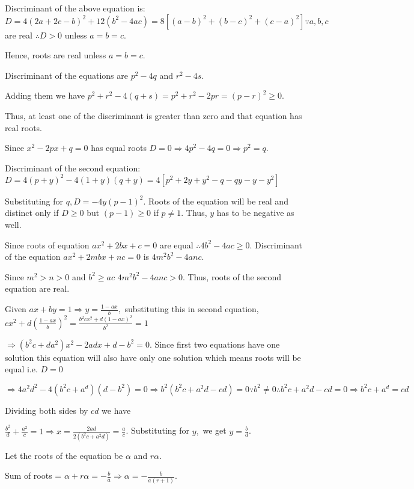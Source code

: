   Discriminant of the above equation is: $D = 4(2a + 2c - b)^2 + 12(b^2 - 4ac) = 8[(a - b)^2 + (b - c)^2 +
    (c - a)^2]\because a, b, c$ are real $\therefore D > 0$ unless $a = b = c$.

  Hence, roots are real unless $a = b = c$.
\item Discriminant of the equations are $p^2 - 4q$ and $r^2 - 4s$.

  Adding them we have $p^2 + r^2 - 4(q + s) = p^2 + r^2 - 2pr = (p - r)^2 \geq 0$.

  Thus, at least one of the discriminant is greater than zero and that equation has real roots.
\item Since $x^2 - 2px + q = 0$ has equal roots $D = 0 \Rightarrow 4p^2 - 4q = 0 \Rightarrow p^2 = q$.

  Discriminant of the second equation: $D = 4(p + y)^2 - 4(1 + y)(q + y) = 4[p^2 + 2y + y^2 - q -qy -y - y^2]$

  Substituting for $q, D = -4y(p - 1)^2$. Roots of the equation will be real and distinct only if $D \geq
  0$ but $(p - 1) \geq 0$ if $p \neq 1$. Thus, $y$ has to be negative as well.
\item Since roots of equation $ax^2 + 2bx + c = 0$ are equal $\therefore 4b^2 - 4ac \geq 0$. Discriminant of
  the equation $ax^2 + 2mbx + nc = 0$ is $4m^2b^2 - 4anc$.

  Since $m^2 > n > 0$ and $b^2 \geq ac$ $4m^2b^2 - 4anc > 0$. Thus, roots of the second equation are real.
\item Given $ax + by = 1 \Rightarrow y = \frac{1 - ax}{b},$ substituting this in second equation, $cx^2 +
  d\left(\frac{1 - ax}{b}\right)^2 = \frac{b^2cx^2 + d(1 - ax)^2}{b^2} = 1$

  $\Rightarrow (b^2c + da^2)x^2 - 2adx + d - b^2 = 0$. Since first two equations have one solution this
  equation will also have only one solution which means roots will be equal i.e. $D = 0$

  $\Rightarrow 4a^2d^2 - 4(b^2c + a^d)(d - b^2) = 0\Rightarrow b^2(b^2c + a^2d - cd) = 0\because b^2 \ne 0
  \therefore b^2c + a^2d - cd = 0 \Rightarrow b^2c + a^d = cd$

  Dividing both sides by $cd$ we have

  $\frac{b^2}{d} + \frac{a^2}{c} = 1\Rightarrow x = \frac{2ad}{2(b^2c + a^2d)} = \frac{a}{c}$. Substituting
  for $y,$ we get $y = \frac{b}{d}$.
\item Let the roots of the equation be $\alpha$ and $r\alpha$.

  Sum of roots = $\alpha + r\alpha = -\frac{b}{a} \Rightarrow \alpha = -\frac{b}{a(r + 1)}$.

